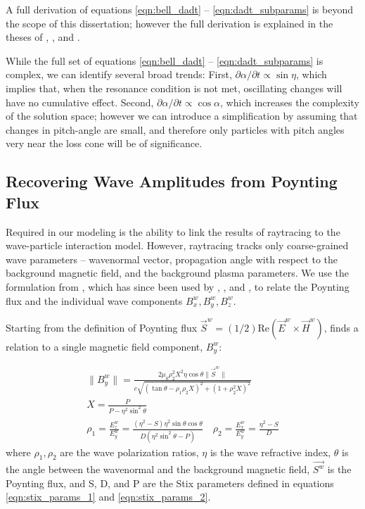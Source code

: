 A full derivation of equations \eqref{eqn:bell_dadt} -- \eqref{eqn:dadt_subparams} is beyond the scope of this dissertation; however the full derivation is explained in the theses of \cite{Bortnik2005}, \cite{Ristic1993}, and \cite{Bell1984}.

While the full set of equations \eqref{eqn:bell_dadt} -- \eqref{eqn:dadt_subparams} is complex, we can identify several broad trends: First, $\partial \alpha / \partial t \propto \sin \eta$, which implies that, when the resonance condition is not met, oscillating changes will have no cumulative effect. Second, $\partial \alpha / \partial t \propto \cos \alpha$, which increases the complexity of the solution space; however we can introduce a simplification by assuming that changes in pitch-angle are small, and therefore only particles with pitch angles very near the loss cone will be of significance. 

%

\subsection{Recovering Wave Amplitudes from Poynting Flux}
Required in our modeling is the ability to link the results of raytracing to the wave-particle interaction model. However, raytracing tracks only coarse-grained wave parameters -- wavenormal vector, propagation angle with respect to the background magnetic field, and the background plasma parameters. We use the formulation from \cite{Bell1984}, which has since been used by \cite{Ristic1993}, \cite{Lauben1998}, and \cite{Bortnik2006}, to relate the Poynting flux and the individual wave components $B_x^w, B_y^w, B_z^w$.

Starting from the definition of Poynting flux $\vec{S}^w = (1/2) \mathrm{Re}(\vec{E}^w\times\vec{H}^w)$, \cite{Bell1984} finds a relation to a single magnetic field component, $B_y^w$:

\begin{gather}
\|B_y^w\| =  \frac{2\mu_0\rho_2^2 X^2 \eta \cos\theta \|\vec{S}^w\|}{c\sqrt{(\tan\theta - \rho_1 \rho_2 X)^2 + (1 + \rho_2^2 X)^2}} \\
X = \frac{P}{P - \eta^2\sin^2\theta} \\
\rho_1 = \frac{E_z^w}{E_y^w} = \frac{(\eta^2 - S) \eta^2 \sin\theta\cos\theta}{D (\eta^2 \sin^2 \theta - P)} \quad \rho_2 = \frac{E_x^w}{E_y^w} = \frac{\eta^2 - S}{D}
\end{gather}
\noindent where $\rho_1, \rho_2$ are the wave polarization ratios, $\eta$ is the wave refractive index, $\theta$ is the angle between the wavenormal and the background magnetic field, $\vec{S^w}$ is the Poynting flux, and S, D, and P are the Stix parameters defined in equations \eqref{eqn:stix_params_1} and \eqref{eqn:stix_params_2}.

